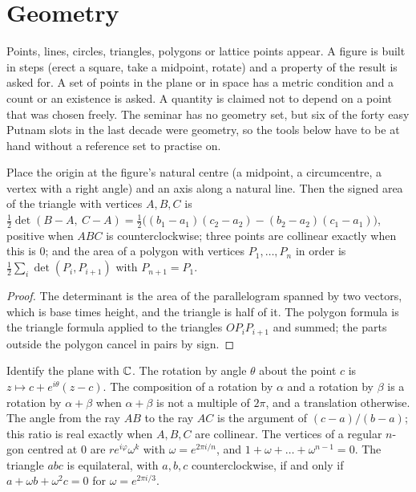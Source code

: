 \section{Geometry}

\begin{recognise}
Points, lines, circles, triangles, polygons or lattice points appear. A figure is built in steps (erect a square, take a midpoint, rotate) and a property of the result is asked for. A set of points in the plane or in space has a metric condition and a count or an existence is asked. A quantity is claimed not to depend on a point that was chosen freely. The seminar has no geometry set, but six of the forty easy Putnam slots in the last decade were geometry, so the tools below have to be at hand without a reference set to practise on.
\end{recognise}

\begin{proposition}[Coordinates]
Place the origin at the figure's natural centre (a midpoint, a circumcentre, a vertex with a right angle) and an axis along a natural line. Then the signed area of the triangle with vertices $A,B,C$ is $\tfrac12\det(B-A,\ C-A)=\tfrac12\bigl((b_1-a_1)(c_2-a_2)-(b_2-a_2)(c_1-a_1)\bigr)$, positive when $ABC$ is counterclockwise; three points are collinear exactly when this is $0$; and the area of a polygon with vertices $P_1,\dots,P_n$ in order is $\tfrac12\sum_i\det(P_i,P_{i+1})$ with $P_{n+1}=P_1$.
\end{proposition}

\begin{proof}
The determinant is the area of the parallelogram spanned by two vectors, which is base times height, and the triangle is half of it. The polygon formula is the triangle formula applied to the triangles $OP_iP_{i+1}$ and summed; the parts outside the polygon cancel in pairs by sign.
\end{proof}

\begin{proposition}
Identify the plane with $\mathbb{C}$. The rotation by angle $\theta$ about the point $c$ is $z\mapsto c+e^{i\theta}(z-c)$. The composition of a rotation by $\alpha$ and a rotation by $\beta$ is a rotation by $\alpha+\beta$ when $\alpha+\beta$ is not a multiple of $2\pi$, and a translation otherwise. The angle from the ray $AB$ to the ray $AC$ is the argument of $(c-a)/(b-a)$; this ratio is real exactly when $A,B,C$ are collinear. The vertices of a regular $n$-gon centred at $0$ are $r e^{i\varphi}\omega^k$ with $\omega=e^{2\pi i/n}$, and $1+\omega+\dots+\omega^{n-1}=0$. The triangle $abc$ is equilateral, with $a,b,c$ counterclockwise, if and only if $a+\omega b+\omega^2c=0$ for $\omega=e^{2\pi i/3}$.
\end{proposition}

